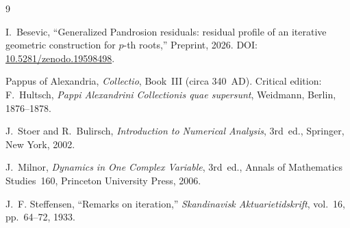 \documentclass[11pt,a4paper]{article}
\theoremstyle{definition}
\begin{document}
\begin{thebibliography}{9}

I.~Besevic,
``Generalized Pandrosion residuals: residual profile of an iterative geometric construction for $p$-th roots,''
Preprint, 2026.
DOI: \href{https://doi.org/10.5281/zenodo.19598498}{10.5281/zenodo.19598498}.

Pappus of Alexandria,
\textit{Collectio}, Book~III (circa 340~AD).
Critical edition: F.~Hultsch, \textit{Pappi Alexandrini Collectionis quae supersunt},
Weidmann, Berlin, 1876--1878.

J.~Stoer and R.~Bulirsch,
\textit{Introduction to Numerical Analysis},
3rd~ed., Springer, New York, 2002.

J.~Milnor,
\textit{Dynamics in One Complex Variable},
3rd~ed., Annals of Mathematics Studies~160, Princeton University Press, 2006.

J.~F. Steffensen,
``Remarks on iteration,''
\textit{Skandinavisk Aktuarietidskrift}, vol.~16, pp.~64--72, 1933.

\end{thebibliography}
\end{document}
